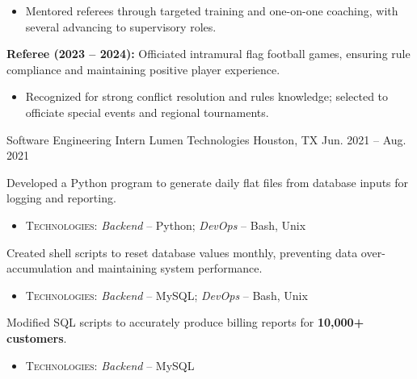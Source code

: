 \begin{cventries}
{\begin{cvitems}
{\begin{itemize}
      \item Mentored referees through targeted training and one-on-one coaching, with several advancing to supervisory roles.
      \end{itemize}
      }
      \item{
      \textbf{Referee (2023 -- 2024):} Officiated intramural flag football games, ensuring rule compliance and maintaining positive player experience.
      \begin{itemize}
      \item Recognized for strong conflict resolution and rules knowledge; selected to officiate special events and regional tournaments.
      \end{itemize}
      }
    \end{cvitems}
  }
\cventry
    {Software Engineering Intern} %
    {Lumen Technologies} %
    {Houston, TX} %
    {Jun. 2021 -- Aug. 2021} %
    {
      \begin{cvitems}
      \item {Developed a Python program to generate daily flat files from database inputs for logging and reporting.
      \begin{itemize}
      \item \textsc{Technologies}: \textit{Backend} – Python; \textit{DevOps} – Bash, Unix
      \end{itemize}
      }
      \item{Created shell scripts to reset database values monthly, preventing data over-accumulation and maintaining system performance.
      \begin{itemize}
      \item \textsc{Technologies}: \textit{Backend} – MySQL; \textit{DevOps} – Bash, Unix
      \end{itemize}
      }
      \item {Modified SQL scripts to accurately produce billing reports for \textbf{10,000+ customers}.
      \begin{itemize}
      \item \textsc{Technologies}: \textit{Backend} – MySQL
      \end{itemize}
      }
      \end{cvitems}
    }
\end{cventries}
